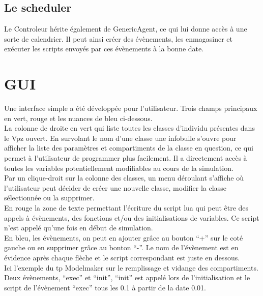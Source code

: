 \subsection{Le scheduler}
Le Controleur hérite également de GenericAgent, ce qui lui donne accès à une sorte de calendrier. Il peut ainsi créer des évènements, les enmagasiner et exécuter les scripts envoyés par ces évènements à la bonne date.

\section{GUI}
Une interface simple a été développée pour l'utilisateur. Trois champs principaux en vert, rouge et les nuances de bleu ci-dessous.\\
La colonne de droite en vert qui liste toutes les classes d'individu présentes dans le Vpz ouvert. En survolant le nom d'une classe une infobulle s'ouvre pour afficher la liste des paramètres et compartiments de la classe en question, ce qui permet à l'utilisateur de programmer plus facilement. Il a directement accès à toutes les variables potentiellement modifiables au cours de la simulation.\\
Par un clique-droit sur la colonne des classes, un menu déroulant s'affiche où l'utilisateur peut décider de créer une nouvelle classe, modifier la classe sélectionnée ou la supprimer.\\
En rouge la zone de texte permettant l'écriture du script lua qui peut être des appels à évènements, des fonctions et/ou des initialisations de variables. Ce script n'est appelé qu'une fois en début de simulation.\\
En bleu, les évènements, on peut en ajouter grâce au bouton ``+'' sur le coté gauche ou en supprimer grâce au bonton ``-''. Le nom de l'évènement est en évidence après chaque flèche et le script correspondant est juste en dessous.\\

Ici l'exemple du tp Modelmaker sur le remplissage et vidange des compartiments.
Deux évènements, ``exec'' et ``init'', ``init'' est appelé lors de l'initialisation et le script de l'évènement ``exec'' tous les 0.1 à partir de la date 0.01.

